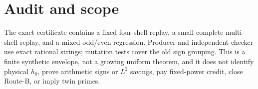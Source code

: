 \documentclass[11pt]{article}
\begin{document}
\section{Audit and scope}
The exact certificate contains a fixed four-shell replay, a small complete
multi-shell replay, and a mixed odd/even regression. Producer and independent
checker use exact rational strings; mutation tests cover the old sign grouping.
This is a finite synthetic envelope, not a growing uniform theorem, and it
does not identify physical $h_0$, prove arithmetic signs or $L^2$ savings,
pay fixed-power credit, close Route-B, or imply twin primes.
\end{document}
